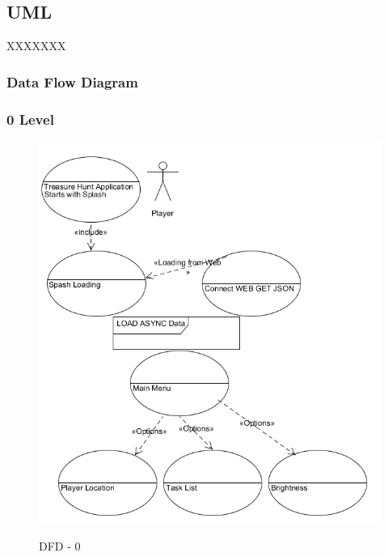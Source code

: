 \subsection{UML }
XXXXXXX
\subsubsection{Data Flow Diagram}

\subsubsection{0 Level}

\begin{figure} [ht]
\centering
\includegraphics[scale=0.5]{dfd0}\\
\caption{DFD - 0 }
\label{the-label-for-cross-referencing}
\end{figure}

